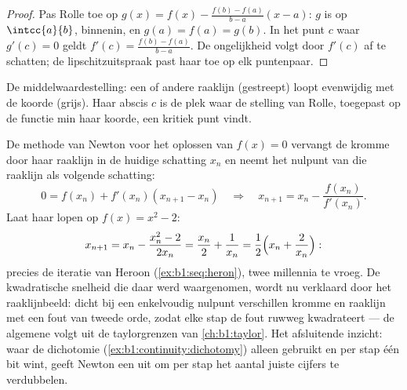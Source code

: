 \begin{proof}
Pas Rolle toe op $g(x) = f(x) - \frac{f(b) - f(a)}{b - a}(x - a)$:
$g$ is  op $\intcc{a}{b}$,  binnenin, en $g(a) =
f(a) = g(b)$. In het punt $c$ waar $g'(c) = 0$ geldt $f'(c) =
\frac{f(b)-f(a)}{b-a}$. De ongelijkheid volgt door $f'(c)$ af te
schatten; de lipschitzuitspraak past haar toe op elk puntenpaar.
\end{proof}

\begin{omfigure}

{\small De middelwaardestelling: een of andere raaklijn (gestreept)
loopt evenwijdig met de koorde (grijs). Haar abscis $c$ is de plek
waar de stelling van Rolle, toegepast op de functie min haar koorde,
een kritiek punt vindt.}
\end{omfigure}

\begin{example}\label{ex:b1:derivative:newton}
De methode van Newton voor het oplossen van $f(x) = 0$ vervangt
de kromme door haar raaklijn in de huidige schatting $x_n$ en
neemt het nulpunt van die raaklijn als volgende schatting:
\[
0 = f(x_n) + f'(x_n)(x_{n+1} - x_n)
\quad\Longrightarrow\quad
x_{n+1} = x_n - \frac{f(x_n)}{f'(x_n)} .
\]
Laat haar lopen op $f(x) = x^2 - 2$:
\[
x_{n+1} = x_n - \frac{x_n^2 - 2}{2x_n}
= \frac{x_n}{2} + \frac{1}{x_n}
= \frac12\Bigl(x_n + \frac{2}{x_n}\Bigr) :
\]
precies de iteratie van Heroon (\cref{ex:b1:seq:heron}), twee
millennia te vroeg. De kwadratische snelheid die daar werd
waargenomen, wordt nu verklaard door het raaklijnbeeld: dicht bij
een enkelvoudig nulpunt verschillen kromme en raaklijn met een
fout van tweede orde, zodat elke stap de fout ruwweg kwadrateert
--- de algemene  volgt uit de taylorgrenzen van
\cref{ch:b1:taylor}. Het afsluitende inzicht: waar de
dichotomie (\cref{ex:b1:continuity:dichotomy}) alleen
 gebruikt en per stap één bit wint, geeft Newton een
 uit om per stap het aantal juiste cijfers te
verdubbelen.
\end{example}

